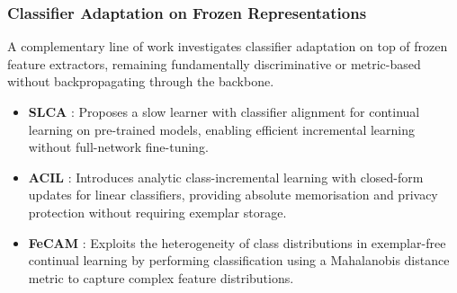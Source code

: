 \subsubsection{Classifier Adaptation on Frozen Representations}
A complementary line of work investigates classifier adaptation on top of frozen feature extractors, remaining fundamentally discriminative or metric-based without backpropagating through the backbone.
\begin{itemize}
	\item \textbf{SLCA} \cite{zhang2023slca}: Proposes a slow learner with classifier alignment for continual learning on pre-trained models, enabling efficient incremental learning without full-network fine-tuning.
	\item \textbf{ACIL} \cite{zhuang2022acil}: Introduces analytic class-incremental learning with closed-form updates for linear classifiers, providing absolute memorisation and privacy protection without requiring exemplar storage.
	\item \textbf{FeCAM} \cite{goswami2024fecam}: Exploits the heterogeneity of class distributions in exemplar-free continual learning by performing classification using a Mahalanobis distance metric to capture complex feature distributions.
\end{itemize}

